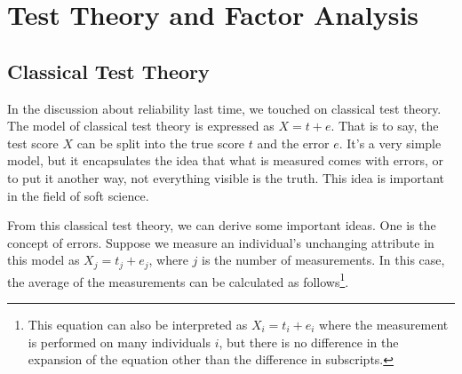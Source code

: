\documentclass{ltjsbook}
\begin{document}
\chapter{Test Theory and Factor Analysis}
\label{x03_testTheory}

\section{Classical Test Theory}
In the discussion about reliability last time, we touched on classical test theory. The model of classical test theory is expressed as $X=t+e$. That is to say, the test score $X$ can be split into the true score $t$ and the error $e$.
It's a very simple model, but it encapsulates the idea that what is measured comes with errors, or to put it another way, not everything visible is the truth. This idea is important in the field of soft science.

From this classical test theory, we can derive some important ideas. One is the concept of errors. Suppose we measure an individual's unchanging attribute in this model as $X_j = t_j + e_j$, where $j$ is the number of measurements. In this case, the average of the measurements can be calculated as follows\footnote{This equation can also be interpreted as $X_i = t_i + e_i$ where the measurement is performed on many individuals $i$, but there is no difference in the expansion of the equation other than the difference in subscripts.}.
\end{document}
